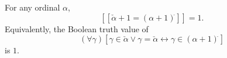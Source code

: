 For any ordinal $\alpha$,
$$[\![\check{\alpha} + 1 = (\alpha + 1)^{\check{}}]\!] = 1.$$
Equivalently, the Boolean truth value of
$$(\forall \gamma)[\gamma \in \check{\alpha} \vee \gamma = \check{\alpha} \leftrightarrow \gamma \in (\alpha + 1)^{\check{}}]$$
is $1$.

